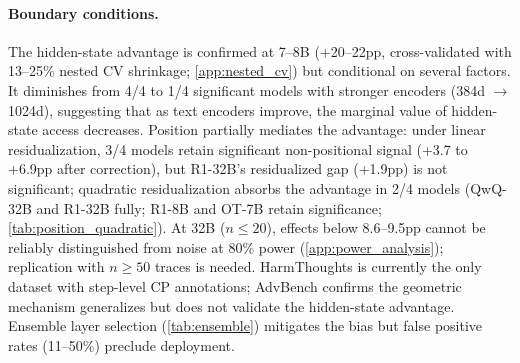 \begin{table}[t]
\centering
\small
{}
\caption{Consolidated findings across contributions. Layer gap: crossing-rate composite vs.\ threshold-based selection (C1). $\Delta$Prec: HS$-$text precision advantage at threshold-based layers; \checkmark/{\scriptsize$\times$} = survives/fails Holm--Bonferroni (C2). Pos.\ resid.: HS advantage survives linear/quadratic position residualization. $^\dagger$Sample-limited ($n \leq 20$).}
\label{tab:consolidated}
\end{table}

\paragraph{Boundary conditions.} The hidden-state advantage is confirmed at 7--8B (+20--22pp, cross-validated with 13--25\% nested CV shrinkage; \cref{app:nested_cv}) but conditional on several factors. It diminishes from 4/4 to 1/4 significant models with stronger encoders (384d $\to$ 1024d), suggesting that as text encoders improve, the marginal value of hidden-state access decreases. Position partially mediates the advantage: under linear residualization, 3/4 models retain significant non-positional signal (+3.7 to +6.9pp after correction), but R1-32B's residualized gap (+1.9pp) is not significant; quadratic residualization absorbs the advantage in 2/4 models (QwQ-32B and R1-32B fully; R1-8B and OT-7B retain significance; \cref{tab:position_quadratic}). At 32B ($n \leq 20$), effects below 8.6--9.5pp cannot be reliably distinguished from noise at 80\% power (\cref{app:power_analysis}); replication with $n \geq 50$ traces is needed. HarmThoughts is currently the only dataset with step-level CP annotations; AdvBench confirms the geometric mechanism generalizes but does not validate the hidden-state advantage. Ensemble layer selection (\cref{tab:ensemble}) mitigates the bias but false positive rates (11--50\%) preclude deployment.

